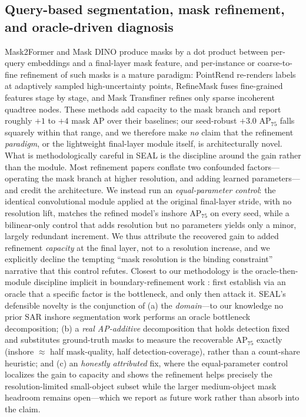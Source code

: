 \documentclass[journal]{IEEEtran}
\begin{document}
\subsection{Query-based segmentation, mask refinement, and oracle-driven diagnosis}
Mask2Former \cite{cheng2022mask2former} and Mask DINO \cite{li2023maskdino} produce masks by a dot product between per-query embeddings and a final-layer mask feature, and per-instance or coarse-to-fine refinement of such masks is a mature paradigm: PointRend \cite{kirillov2020pointrend} re-renders labels at adaptively sampled high-uncertainty points, RefineMask \cite{zhang2021refinemask} fuses fine-grained features stage by stage, and Mask Transfiner \cite{ke2022masktransfiner} refines only sparse incoherent quadtree nodes. These methods add capacity to the mask branch and report roughly $+1$ to $+4$ mask AP over their baselines; our seed-robust $+3.0$ AP$_{75}$ falls squarely within that range, and we therefore make \emph{no} claim that the refinement \emph{paradigm}, or the lightweight final-layer module itself, is architecturally novel. What is methodologically careful in SEAL is the discipline around the gain rather than the module. Most refinement papers conflate two confounded factors---operating the mask branch at higher resolution, and adding learned parameters---and credit the architecture. We instead run an \emph{equal-parameter control}: the identical convolutional module applied at the original final-layer stride, with no resolution lift, matches the refined model's inshore AP$_{75}$ on every seed, while a bilinear-only control that adds resolution but no parameters yields only a minor, largely redundant increment. We thus attribute the recovered gain to added refinement \emph{capacity} at the final layer, not to a resolution increase, and we explicitly decline the tempting ``mask resolution is the binding constraint'' narrative that this control refutes. Closest to our methodology is the oracle-then-module discipline implicit in boundary-refinement work \cite{cheng2021boundary,tang2021bpr}: first establish via an oracle that a specific factor is the bottleneck, and only then attack it. SEAL's defensible novelty is the conjunction of (a) the \emph{domain}---to our knowledge no prior SAR inshore segmentation work performs an oracle bottleneck decomposition; (b) a \emph{real AP-additive} decomposition that holds detection fixed and substitutes ground-truth masks to measure the recoverable AP$_{75}$ exactly (inshore $\approx$ half mask-quality, half detection-coverage), rather than a count-share heuristic; and (c) an \emph{honestly attributed} fix, where the equal-parameter control localizes the gain to capacity and shows the refinement helps precisely the resolution-limited small-object subset while the larger medium-object mask headroom remains open---which we report as future work rather than absorb into the claim.
\end{document}
